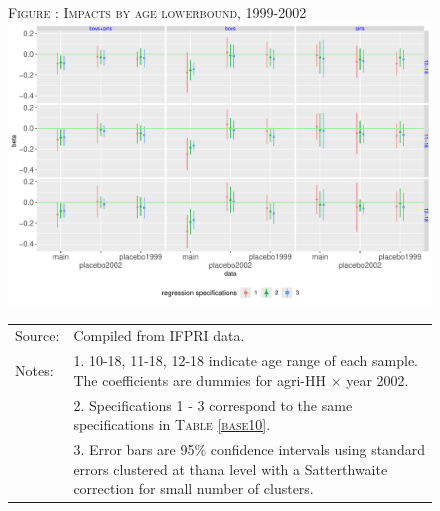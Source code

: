 \documentclass[12pt,letterpaper]{article}
\newcommand{\0}{\ensuremath{\mbox{\boldmath $0$}}}
\begin{document}
{\begin{figure}
\hfil\textsc{\footnotesize Figure \thefigure: Impacts by age lowerbound, 1999-2002\label{GenderAgeGroup2Impacts}}\\
\hfil \includegraphics[height=.3\paperheight]{Figures/App_MainVsPlaceboPlotsByAgeLBByGender.pdf}\\
\renewcommand{\arraystretch}{1}
\hfil\begin{tabular}{>{\hfill\scriptsize}p{1cm}<{}>{\scriptsize}p{11cm}<{\hfill}}
Source: & Compiled from IFPRI data. \\[-1ex]
Notes:& 1. 10-18, 11-18, 12-18 indicate age range of each sample. The coefficients are dummies for agri-HH $\times$ year 2002.\\[-1ex]
& 2. Specifications 1 - 3 correspond to the same specifications in \textsc{Table \ref{base10}}. \\[-1ex]
& 3. Error bars are 95\% confidence intervals using standard errors clustered at thana level with a Satterthwaite correction for small number of clusters.
\end{tabular}
\end{figure}


}
\end{document}
